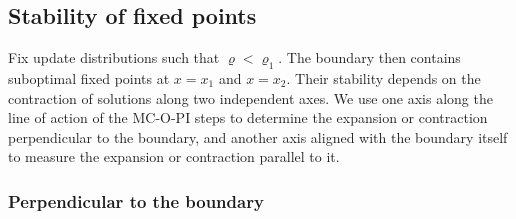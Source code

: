 



\subsection{Stability of fixed points}

Fix update distributions such that $\varrho < \varrho_1$. The boundary then contains suboptimal fixed points at $x=x_1$ and $x=x_2$.
Their stability depends on the contraction of solutions along two independent axes.
We use one axis along the line of action of the MC-O-PI steps to determine the expansion or contraction perpendicular to the boundary,
and another axis aligned with the boundary itself to measure the expansion or contraction parallel to it.

\subsubsection{Perpendicular to the boundary}

